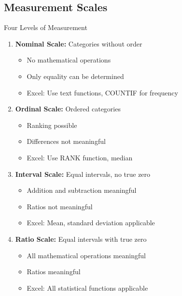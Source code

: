 \documentclass[12pt,a4paper]{book}
\begin{document}
\subsection{Measurement Scales}

\begin{definition}{Four Levels of Measurement}
\begin{enumerate}
    \item \textbf{Nominal Scale:} Categories without order
        \begin{itemize}
            \item No mathematical operations
            \item Only equality can be determined
            \item Excel: Use text functions, COUNTIF for frequency
        \end{itemize}
    
    \item \textbf{Ordinal Scale:} Ordered categories
        \begin{itemize}
            \item Ranking possible
            \item Differences not meaningful
            \item Excel: Use RANK function, median
        \end{itemize}
    
    \item \textbf{Interval Scale:} Equal intervals, no true zero
        \begin{itemize}
            \item Addition and subtraction meaningful
            \item Ratios not meaningful
            \item Excel: Mean, standard deviation applicable
        \end{itemize}
    
    \item \textbf{Ratio Scale:} Equal intervals with true zero
        \begin{itemize}
            \item All mathematical operations meaningful
            \item Ratios meaningful
            \item Excel: All statistical functions applicable
        \end{itemize}
\end{enumerate}
\end{definition}
\end{document}
